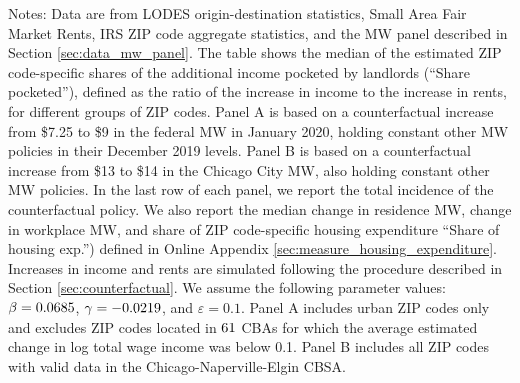 \begin{table}[hbt!]
    \begin{minipage}{.95\textwidth} \footnotesize
        \vspace{3.5mm}
        Notes: 
        Data are from LODES origin-destination statistics, 
        Small Area Fair Market Rents, 
        IRS ZIP code aggregate statistics, and 
        the MW panel described in Section \ref{sec:data_mw_panel}.
        The table shows the median of the estimated ZIP code-specific shares of 
        the additional income pocketed by landlords (``Share pocketed''), 
        defined as the ratio of the increase in income to the increase in rents,
        for different groups of ZIP codes.
        Panel A is based on a counterfactual increase from \$7.25 to \$9 in the 
        federal MW in January 2020, holding constant other MW policies in their 
        December 2019 levels.
        Panel B is based on a counterfactual increase from \$13 to \$14 in the 
        Chicago City MW, also holding constant other MW policies.
        In the last row of each panel, we report the total incidence of the 
        counterfactual policy.
        We also report the median change in residence MW, change in workplace MW,
        and share of ZIP code-specific housing expenditure ``Share of housing 
        exp.'') defined in Online Appendix \ref{sec:measure_housing_expenditure}.
        Increases in income and rents are simulated following the procedure 
        described in Section \ref{sec:counterfactual}.
        We assume the following parameter values: 
        $\beta = 0.0685$, $\gamma = -0.0219$, and $\varepsilon = 0.1$.
        Panel A includes urban ZIP codes only and excludes ZIP codes located 
        in $\textnormal{61}$ CBAs for which the average estimated change in 
        log total wage income was below 0.1.
        Panel B includes all ZIP codes with valid data in the 
        Chicago-Naperville-Elgin CBSA.
    \end{minipage}
\end{table}


